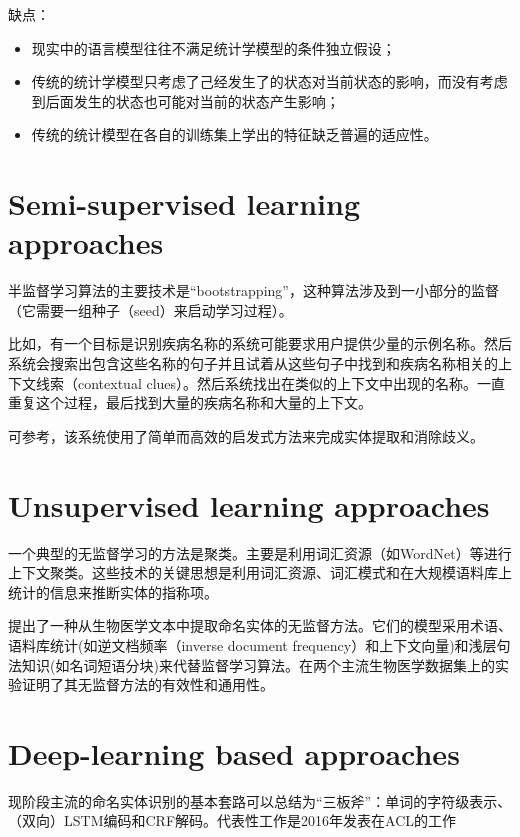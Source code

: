 \documentclass[a4paper,UTF8,no-math]{ctexart}
\begin{document}
	缺点\citep{隋臣2017基于深度学习的中文命名实体识别研究}：
	\begin{itemize}
		\item 现实中的语言模型往往不满足统计学模型的条件独立假设；
		\item 传统的统计学模型只考虑了己经发生了的状态对当前状态的影响，而没有考虑到后面发生的状态也可能对当前的状态产生影响；
		\item 传统的统计模型在各自的训练集上学出的特征缺乏普遍的适应性。
	\end{itemize}
	
	\newpage
	
	\section{Semi-supervised learning approaches}
	
	半监督学习算法的主要技术是“bootstrapping”，这种算法涉及到一小部分的监督（它需要一组种子（seed）来启动学习过程）。
	
	比如，有一个目标是识别疾病名称的系统可能要求用户提供少量的示例名称。然后系统会搜索出包含这些名称的句子并且试着从这些句子中找到和疾病名称相关的上下文线索（contextual clues）。然后系统找出在类似的上下文中出现的名称。一直重复这个过程，最后找到大量的疾病名称和大量的上下文。
	
	可参考\citep{nadeau2006unsupervised}，该系统使用了简单而高效的启发式方法来完成实体提取和消除歧义。
	
	
	
	\section{Unsupervised learning approaches}
	
	一个典型的无监督学习的方法是聚类。主要是利用词汇资源（如WordNet）等进行上下文聚类。这些技术的关键思想是利用词汇资源、词汇模式和在大规模语料库上统计的信息来推断实体的指称项。
	
	\citep{zhang2013unsupervised}提出了一种从生物医学文本中提取命名实体的无监督方法。它们的模型采用术语、语料库统计(如逆文档频率（inverse document frequency）和上下文向量)和浅层句法知识(如名词短语分块)来代替监督学习算法。在两个主流生物医学数据集上的实验证明了其无监督方法的有效性和通用性。 
	
	
	\section{Deep-learning based approaches}
	
	现阶段主流的命名实体识别的基本套路可以总结为“三板斧”：单词的字符级表示、（双向）LSTM编码和CRF解码。代表性工作是2016年发表在ACL的工作
	
\end{document}

